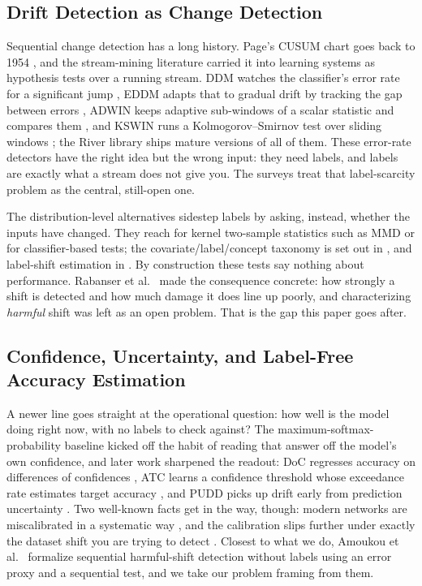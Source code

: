 \documentclass[graybox]{SNmult}
\begin{document}
\subsection{Drift Detection as Change Detection}

Sequential change detection has a long history. Page's CUSUM chart goes back
to 1954 \cite{page1954cusum}, and the stream-mining literature carried it
into learning systems as hypothesis tests over a running stream. DDM watches
the classifier's error rate for a significant jump \cite{gama2004learning},
EDDM adapts that to gradual drift by tracking the gap between errors
\cite{baena2006eddm}, ADWIN keeps adaptive sub-windows of a scalar statistic
and compares them \cite{bifet2007adwin}, and KSWIN runs a Kolmogorov--Smirnov
test over sliding windows \cite{raab2020kswin}; the River library
\cite{montiel2021river} ships mature versions of all of them. These
error-rate detectors have the right idea but the wrong input: they need
labels, and labels are exactly what a stream does not give you. The surveys
\cite{gama2014survey, lu2018learning} treat that label-scarcity problem as
the central, still-open one.

The distribution-level alternatives sidestep labels by asking, instead,
whether the inputs have changed. They reach for kernel two-sample statistics
such as MMD \cite{gretton2012kernel} or for classifier-based tests; the
covariate/label/concept taxonomy is set out in \cite{quinonero2009dataset},
and label-shift estimation in \cite{lipton2018label}. By construction these
tests say nothing about performance. Rabanser et al.\
\cite{rabanser2019failing} made the consequence concrete: how strongly a
shift is detected and how much damage it does line up poorly, and
characterizing \emph{harmful} shift was left as an open problem. That is the
gap this paper goes after.

\subsection{Confidence, Uncertainty, and Label-Free Accuracy Estimation}

A newer line goes straight at the operational question: how well is the model
doing right now, with no labels to check against? The
maximum-softmax-probability baseline \cite{hendrycks2017baseline} kicked off
the habit of reading that answer off the model's own confidence, and later
work sharpened the readout: DoC regresses accuracy on differences of
confidences \cite{guillory2021doc}, ATC learns a confidence threshold whose
exceedance rate estimates target accuracy \cite{garg2022atc}, and PUDD picks
up drift early from prediction uncertainty \cite{pudd2025}. Two well-known
facts get in the way, though: modern networks are miscalibrated in a
systematic way \cite{guo2017calibration}, and the calibration slips further
under exactly the dataset shift you are trying to detect
\cite{ovadia2019trust}. Closest to what we do, Amoukou et al.\
\cite{amoukou2024sequential} formalize sequential harmful-shift detection
without labels using an error proxy and a sequential test, and we take our
problem framing from them.
\end{document}
